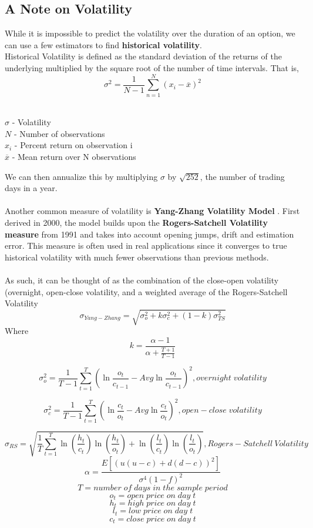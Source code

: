 \subsection{A Note on Volatility}
While it is impossible to predict the volatility over the duration of an option, we can use a few estimators to find \textbf{historical volatility}.
\\ 
Historical Volatility is defined as the standard deviation of the returns of the underlying multiplied by the square root of the number of time intervals. That is,
$$\sigma^{2}=\frac{1}{N-1}\sum_{n=1}^{N}(x_{i}-\overline{x})^{2}$$
\\
\begin{center}
    $\sigma$ - Volatility \\
    $N$ - Number of observations \\
    $x_{i}$ - Percent return on observation i \\
$\overline{x}$ - Mean return over N observations \\
\end{center}

We can then annualize this by multiplying $\sigma$ by $\sqrt{252}$, the number of trading days in a year.
\\
\\
Another common measure of volatility is \textbf{Yang-Zhang Volatility Model} \cite{YangZhang}. First derived in 2000, the model builds upon the  \textbf{Rogers-Satchell Volatility measure}\cite{RogersSatchell} from 1991 and takes into account opening jumps, drift and estimation error. This measure is often used in real applications since it converges to true historical volatility with much fewer observations than previous methods. \\
\\
As such, it can be thought of as the combination of the close-open volatility (overnight, open-close volatility, and a weighted average of the Rogers-Satchell Volatility
$$\sigma_{Yang-Zhang} = \sqrt{\sigma_o^2+k\sigma_c^2+(1-k)\sigma_{TS}^2}$$
Where 
$$k=\frac{\alpha - 1}{\alpha + \frac{T+1}{T-1}}$$

$$\sigma_o^2 = \frac{1}{T-1}\sum_{t=1}^T \left(\ln{\frac{o_t}{c_{t-1}}} - Avg\ln{\frac{o_t}{c_{t-1}}}\right)^2, overnight \; volatility$$

$$\sigma_c^2 = \frac{1}{T-1}\sum_{t=1}^T \left(\ln{\frac{c_t}{o_{t}}} - Avg\ln{\frac{c_t}{o_{t}}}\right)^2, open-close \; volatility$$

$$\sigma_{RS} = \sqrt{\frac{1}{T}\sum_{t=1}^{T}\ln\left(\frac{h_{t}}{c_{t}}\right)\ln\left(\frac{h_{t}}{o_{t}}\right)+\ln\left(\frac{l_{t}}{c_{t}}\right)\ln\left(\frac{l_{t}}{o_{t}}\right)}, Rogers-Satchell\ Volatility$$
\vspace{.5mm}
$$\alpha = \frac{E[(u(u-c)+d(d-c))^2]}{\sigma^4(1-f)^2}$$
$$T = number \; of \; days \; in \; the \; sample \; period$$
$$o_t = open \; price \; on \; day \; t$$
$$h_t = high \; price \; on \; day \; t$$
$$l_t = low \; price \; on \; day \; t$$
$$c_t = close \; price \; on \; day \; t$$



